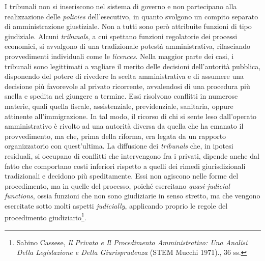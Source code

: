 \documentclass[12pt,it,a4paper,]{report}
\begin{document}
I tribunali non si inseriscono nel sistema di governo e non partecipano
alla realizzazione delle \emph{policies} dell'esecutivo, in quanto
svolgono un compito separato di amministrazione giustiziale. Non a tutti
sono però attribuite funzioni di tipo giudiziale. Alcuni
\emph{tribunals}, a cui spettano funzioni regolatorie dei processi
economici, si avvalgono di una tradizionale potestà amministrativa,
rilasciando provvedimenti individuali come le \emph{licences}. Nella
maggior parte dei casi, i tribunali sono legittimati a vagliare il
merito delle decisioni dell'autorità pubblica, disponendo del potere di
rivedere la scelta amministrativa e di assumere una decisione più
favorevole al privato ricorrente, avvalendosi di una procedura più
snella e spedita nel giungere a termine. Essi risolvono conflitti in
numerose materie, quali quella fiscale, assistenziale, previdenziale,
sanitaria, oppure attinente all'immigrazione. In tal modo, il ricorso di
chi si sente leso dall'operato amministrativo è rivolto ad una autorità
diversa da quella che ha emanato il provvedimento, ma che, prima della
riforma, era legata da un rapporto organizzatorio con quest'ultima. La
diffusione dei \emph{tribunals} che, in ipotesi residuali, si occupano
di conflitti che intervengono fra i privati, dipende anche dal fatto che
comportano costi inferiori rispetto a quelli dei rimedi giurisdizionali
tradizionali e decidono più speditamente. Essi non agiscono nelle forme
del procedimento, ma in quelle del processo, poiché esercitano
\emph{quasi-judicial functions}, ossia funzioni che non sono giudiziarie
in senso stretto, ma che vengono esercitate sotto molti aspetti
\emph{judicially}, applicando proprio le regole del procedimento
giudiziario\footnote{{Sabino Cassese, \emph{Il Privato e Il Procedimento
  Amministrativo: Una Analisi Della Legislazione e Della Giurisprudenza}
  ({STEM Mucchi} 1971).}, 36 ss.}.
\end{document}
